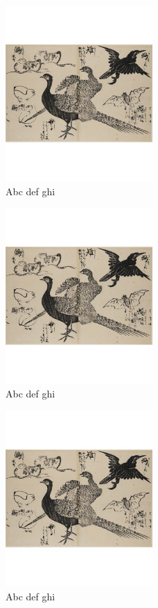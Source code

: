 \documentclass[a4paper,10pt]{article}
\begin{document}
  \par\begin{figure}[hb]
    \centering
    \includegraphics[width=0.5\textwidth]{../public/images/a2-scaled.jpg}
    \caption[Title]{Abc def ghi}
  \end{figure}

  \newpage
  \par\begin{figure}[hb]
    \centering
    \centering\includegraphics[width=0.5\textwidth]{../public/images/a2-scaled}
    \caption[Title]{Abc def ghi}
  \end{figure}

  \newpage
  \par\begin{figure}[hb]
    \centering
    \centering\includegraphics[width=0.5\textwidth]{../public/images/a2-scaled.jpg}
    \caption[Title]{Abc def ghi}
  \end{figure}
\end{document}
